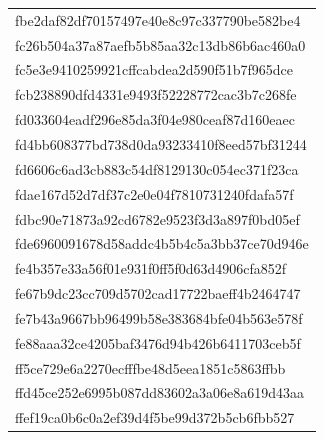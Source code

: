 \begin{tabular}{l}
fbe2daf82df70157497e40e8c97c337790be582be4 \\
fc26b504a37a87aefb5b85aa32c13db86b6ac460a0 \\
fc5e3e9410259921cffcabdea2d590f51b7f965dce \\
fcb238890dfd4331e9493f52228772cac3b7c268fe \\
fd033604eadf296e85da3f04e980ceaf87d160eaec \\
fd4bb608377bd738d0da93233410f8eed57bf31244 \\
fd6606c6ad3cb883c54df8129130c054ec371f23ca \\
fdae167d52d7df37c2e0e04f7810731240fdafa57f \\
fdbc90e71873a92cd6782e9523f3d3a897f0bd05ef \\
fde6960091678d58addc4b5b4c5a3bb37ce70d946e \\
fe4b357e33a56f01e931f0ff5f0d63d4906cfa852f \\
fe67b9dc23cc709d5702cad17722baeff4b2464747 \\
fe7b43a9667bb96499b58e383684bfe04b563e578f \\
fe88aaa32ce4205baf3476d94b426b6411703ceb5f \\
ff5ce729e6a2270ecfffbe48d5eea1851c5863ffbb \\
ffd45ce252e6995b087dd83602a3a06e8a619d43aa \\
ffef19ca0b6c0a2ef39d4f5be99d372b5cb6fbb527 \\
\bottomrule
\end{tabular}
